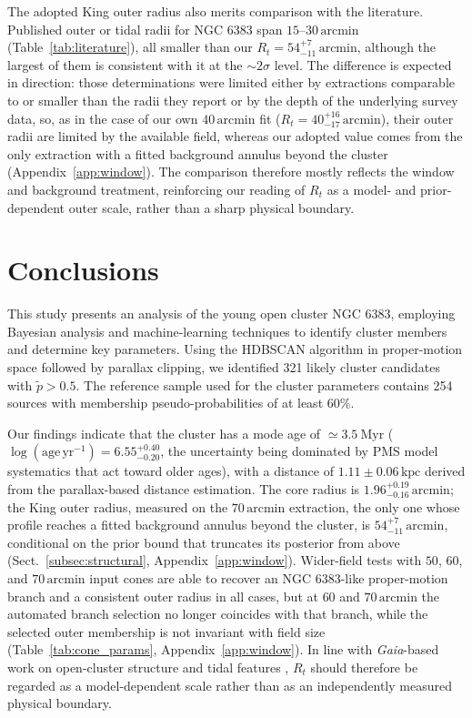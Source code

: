 \documentclass{aa}
\begin{document}
The adopted King outer radius also merits comparison with the literature. Published outer or tidal radii for NGC 6383 span $15$--$30\,\mathrm{arcmin}$ (Table~\ref{tab:literature}), all smaller than our $R_t=54^{+7}_{-11}\,\mathrm{arcmin}$, although the largest of them is consistent with it at the ${\sim}2\sigma$ level. The difference is expected in direction: those determinations were limited either by extractions comparable to or smaller than the radii they report or by the depth of the underlying survey data, so, as in the case of our own $40\,\mathrm{arcmin}$ fit ($R_t=40^{+16}_{-17}\,\mathrm{arcmin}$), their outer radii are limited by the available field, whereas our adopted value comes from the only extraction with a fitted background annulus beyond the cluster (Appendix~\ref{app:window}). The comparison therefore mostly reflects the window and background treatment, reinforcing our reading of $R_t$ as a model- and prior-dependent outer scale, rather than a sharp physical boundary.

\section{Conclusions}\label{sec:conclusion}

This study presents an analysis of the young open cluster NGC 6383, employing Bayesian analysis and machine-learning techniques to identify cluster members and determine key parameters. Using the HDBSCAN algorithm in proper-motion space followed by parallax clipping, we identified 321 likely cluster candidates with $\tilde{p}>0.5$. The reference sample used for the cluster parameters contains 254 sources with membership pseudo-probabilities of at least 60\%.

Our findings indicate that the cluster has a mode age of $\simeq3.5~\mathrm{Myr}$ ($\log(\mathrm{age}\,\mathrm{yr^{-1}}) = 6.55^{+0.40}_{-0.20}$, the uncertainty being dominated by PMS model systematics that act toward older ages), with a distance of $1.11 \pm 0.06\,\mathrm{kpc}$ derived from the parallax-based distance estimation. The core radius is $1.96^{+0.19}_{-0.16}\,\mathrm{arcmin}$; the King outer radius, measured on the $70\,\mathrm{arcmin}$ extraction, the only one whose profile reaches a fitted background annulus beyond the cluster, is $54^{+7}_{-11}\,\mathrm{arcmin}$, conditional on the prior bound that truncates its posterior from above (Sect.~\ref{subsec:structural}, Appendix~\ref{app:window}). Wider-field tests with $50$, $60$, and $70\,\mathrm{arcmin}$ input cones are able to recover an NGC 6383-like proper-motion branch and a consistent outer radius in all cases, but at $60$ and $70\,\mathrm{arcmin}$ the automated branch selection no longer coincides with that branch, while the selected outer membership is not invariant with field size (Table~\ref{tab:cone_params}, Appendix~\ref{app:window}). In line with \textit{Gaia}-based work on open-cluster structure and tidal features \citep{2025MNRAS.539.2513A,2025A&A...694A.258R,2025A&A...698A.156X}, $R_t$ should therefore be regarded as a model-dependent scale rather than as an independently measured physical boundary.
\end{document}
